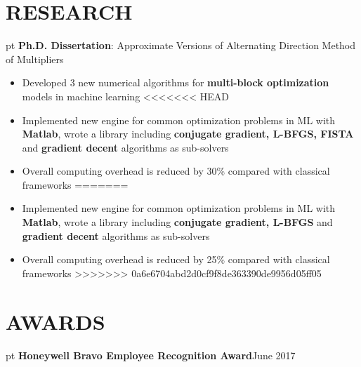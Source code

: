 \documentclass[10.5pt]{res} %
\begin{document}
\begin{resume}
\section{RESEARCH}  pt
	\textbf{Ph.D. Dissertation}: Approximate Versions of Alternating Direction Method of Multipliers
	\begin{itemize} pt
		\item Developed 3 new %
		 numerical algorithms for \textbf{multi-block optimization} models in machine learning  %
<<<<<<< HEAD
		\item Implemented new engine for common optimization problems in ML with \textbf{Matlab}, wrote a library including \textbf{conjugate gradient, L-BFGS, FISTA} and \textbf{gradient decent} algorithms as sub-solvers
		\item Overall computing overhead is reduced by 30\% compared with classical frameworks
=======
		\item Implemented new engine for common optimization problems in ML with \textbf{Matlab}, wrote a library including \textbf{conjugate gradient, L-BFGS} and \textbf{gradient decent} algorithms as sub-solvers
		\item Overall computing overhead is reduced by 25\% compared with classical frameworks
>>>>>>> 0a6e6704abd2d0cf9f8de363390de9956d05ff05
	\end{itemize}
%
\section{AWARDS}  pt
\textbf{Honeywell Bravo Employee Recognition Award}\hfill June 2017
%

\end{resume}
\end{document}
